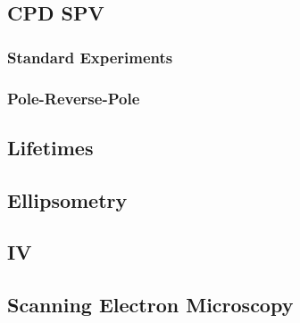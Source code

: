 \subsection{CPD SPV}
\subsubsection{Standard Experiments}
\subsubsection{Pole-Reverse-Pole}
\subsection{Lifetimes}
\subsection{Ellipsometry}
\subsection{\ir{}}
\subsection{IV}
\subsection{Scanning Electron Microscopy}

